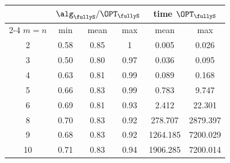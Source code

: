 \begin{tabular}{cccc|cc}
        \toprule
        \multicolumn{1}{c}{} & \multicolumn{3}{c}{$\alg_\fullyS/\OPT_\fullyS$} & \multicolumn{2}{c}{time $\OPT_\fullyS$} \\ \cmidrule{2-4} \cmidrule{5-6}
        $m=n$ & min & mean & max & mean & max \\ 
        \midrule
        2 & 0.58 & 0.85 & 1 & 0.005 & 0.026 \\
        3 & 0.50 & 0.80 & 0.97 & 0.036 & 0.095 \\
        4 & 0.63 & 0.81 & 0.99 & 0.089 & 0.168 \\
        5 & 0.66 & 0.83 & 0.99 & 0.783 & 9.747 \\
        6 & 0.69 & 0.81 & 0.93 & 2.412 & 22.301 \\
        8 & 0.70 & 0.83 & 0.92 & 278.707 & 2879.397 \\
        9 & 0.68 & 0.83 & 0.92 & 1264.185 & 7200.029 \\
        10 & 0.71 & 0.83 & 0.94 & 1906.285 & 7200.014 \\
        \bottomrule
\end{tabular}
